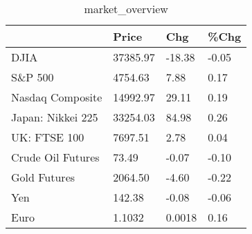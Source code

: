 \documentclass{article}%
\begin{document}
%


\begin{table}[htbp]%
\caption{market\_overview}%
\centering%
\begin{adjustbox}{width=1\textwidth}%
\begin{tabular}{llll}
\toprule
                  &    Price &    Chg &  \%Chg \\
\midrule
             DJIA & 37385.97 & -18.38 & -0.05 \\
          S\&P 500 &  4754.63 &   7.88 &  0.17 \\
 Nasdaq Composite & 14992.97 &  29.11 &  0.19 \\
Japan: Nikkei 225 & 33254.03 &  84.98 &  0.26 \\
     UK: FTSE 100 &  7697.51 &   2.78 &  0.04 \\
Crude Oil Futures &    73.49 &  -0.07 & -0.10 \\
     Gold Futures &  2064.50 &  -4.60 & -0.22 \\
              Yen &   142.38 &  -0.08 & -0.06 \\
             Euro &   1.1032 & 0.0018 &  0.16 \\
\bottomrule
\end{tabular}
%
\end{adjustbox}%
\end{table}

%
\end{document}
